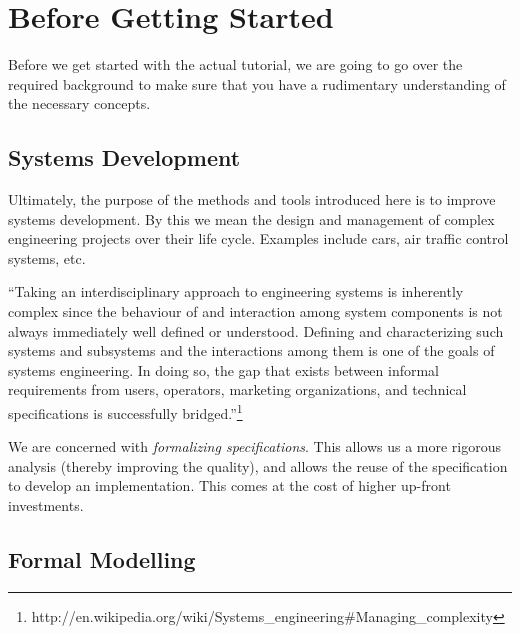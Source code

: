 \section{Before Getting Started}
\label{tutorial_1}

Before we get started with the actual tutorial, we are going to go over the required background to make sure that you have a rudimentary understanding of the necessary concepts.


\subsection{Systems Development}

Ultimately, the purpose of the methods and tools introduced here is to improve systems development.  By this we mean the design and management of complex engineering projects over their life cycle.  Examples include cars, air traffic control systems, etc.

``Taking an interdisciplinary approach to engineering systems is inherently complex since the behaviour of and interaction among system components is not always immediately well defined or understood. Defining and characterizing such systems and subsystems and the interactions among them is one of the goals of systems engineering. In doing so, the gap that exists between informal requirements from users, operators, marketing organizations, and technical specifications is successfully bridged.''\footnote{http://en.wikipedia.org/wiki/Systems\_engineering\#Managing\_complexity}

We are concerned with \textit{formalizing specifications}.  This allows us a more rigorous analysis (thereby improving the quality), and allows the reuse of the specification to develop an implementation.  This comes at the cost of higher up-front investments.

\subsection{Formal Modelling}



